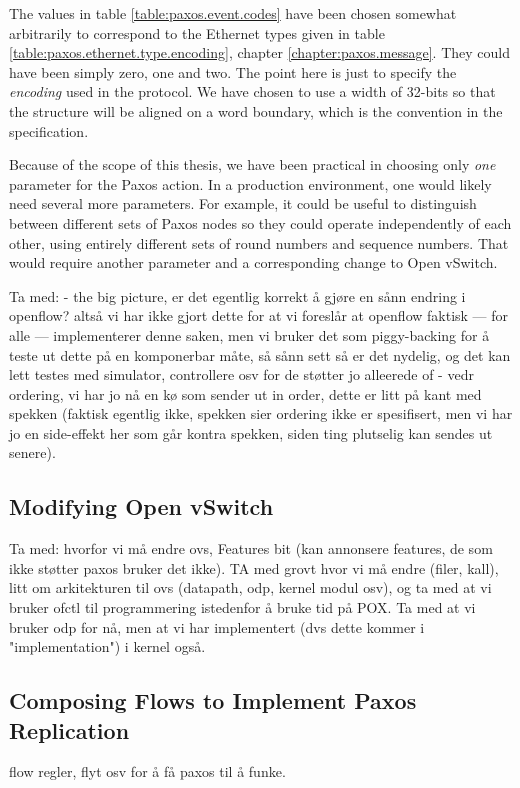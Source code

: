 The values in table \ref{table:paxos.event.codes} have been chosen
somewhat arbitrarily to correspond to the Ethernet types given
in table \ref{table:paxos.ethernet.type.encoding}, chapter
\vref{chapter:paxos.message}.  They could have been simply zero, one
and two.  The point here is just to specify the \textit{encoding} 
used in the protocol.  We have chosen to use a width of 32-bits so
that the structure will be aligned on a word boundary, which is the
convention in the specification.

Because of the scope of this thesis, we have been practical in choosing only
\textit{one} parameter for the Paxos action.
%
In a production environment, one would likely need several more parameters.
%
For example, it could be useful to distinguish between different sets of
Paxos nodes so they could operate independently of each other, using
entirely different sets of round numbers and sequence numbers.
That would require another parameter and a corresponding change to
Open vSwitch.

Ta med:
  - the big picture, er det egentlig korrekt å gjøre en sånn endring
  i openflow? altså vi har ikke gjort dette for at vi foreslår at
  openflow faktisk --- for alle --- implementerer denne saken, men
  vi bruker det som piggy-backing for å teste ut dette på en
  komponerbar måte, så sånn sett så er det nydelig, og det kan
  lett testes med simulator, controllere osv for de støtter jo
  alleerede of
  - vedr ordering, vi har jo nå en kø som sender ut in order,
   dette er litt på kant med spekken (faktisk egentlig ikke,
       spekken sier ordering ikke er spesifisert, men vi har
       jo en side-effekt her som går kontra spekken, siden
       ting plutselig kan sendes ut senere).

\subsection{Modifying Open vSwitch}

Ta med:  hvorfor vi må endre ovs,
Features bit (kan annonsere features, de som ikke støtter paxos
bruker det ikke). TA med grovt hvor vi må endre (filer, kall),
litt om arkitekturen til ovs (datapath, odp, kernel modul osv), og ta med at vi bruker
ofctl til programmering istedenfor å bruke tid på POX.
Ta med at vi bruker odp for nå, men at vi har implementert (dvs dette kommer
i "implementation") i kernel også.

\subsection{Composing Flows to Implement Paxos Replication}

flow regler, flyt osv for å få paxos til å funke.
